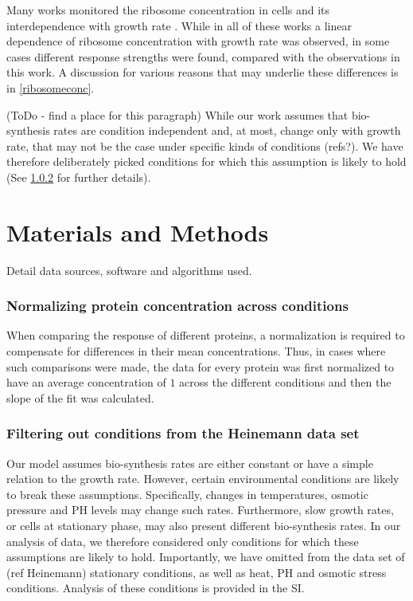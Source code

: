 \documentclass[notitlepage]{article}
\begin{document}
Many works monitored the ribosome concentration in cells and its interdependence with growth rate \parencite{Scott2010, Bremer1987, Schaechter1958, 1974, Zaslaver2009, eco-sal}.
While in all of these works a linear dependence of ribosome concentration with growth rate was observed, in some cases different response strengths were found, compared with the observations in this work.
A discussion for various reasons that may underlie these differences is in \ref{ribosomeconc}.

(ToDo - find a place for this paragraph)
While our work assumes that bio-synthesis rates are condition independent and, at most, change only with growth rate, that may not be the case under specific kinds of conditions (refs?).
We have therefore deliberately picked conditions for which this assumption is likely to hold (See \ref{heinemanncond} for further details).

\section{Materials and Methods}
Detail data sources, software and algorithms used.
\subsubsection{Normalizing protein concentration across conditions}
\label{concacrossconds}
When comparing the response of different proteins, a normalization is required to compensate for differences in their mean concentrations.
Thus, in cases where such comparisons were made, the data for every protein was first normalized to have an average concentration of $1$ across the different conditions and then the slope of the fit was calculated.

\subsubsection{Filtering out conditions from the Heinemann data set}
\label{heinemanncond}
Our model assumes bio-synthesis rates are either constant or have a simple relation to the growth rate.
However, certain environmental conditions are likely to break these assumptions.
Specifically, changes in temperatures, osmotic pressure and PH levels may change such rates.
Furthermore, slow growth rates, or cells at stationary phase, may also present different bio-synthesis rates.
In our analysis of data, we therefore considered only conditions for which these assumptions are likely to hold.
Importantly, we have omitted from the data set of (ref Heinemann) stationary conditions, as well as heat, PH and osmotic stress conditions.
Analysis of these conditions is provided in the SI.
\end{document}
